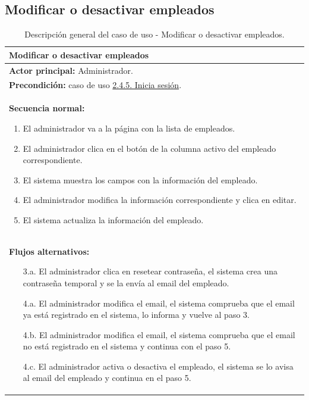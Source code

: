 \documentclass[12pt, a4paper, twoside]{report}
\begin{document}
        \subsection{Modificar o desactivar empleados}
            \begin{table}[H]
            \centering
            \begin{tabular}{|p{16cm}|} 
            \hline
            \textbf{Modificar o desactivar empleados} \\ \hline
            \textbf{Actor principal:} Administrador. \\ \hline
            \textbf{Precondición:} caso de uso \hyperref[subsec:2.4.5.]{2.4.5. Inicia sesión}. \\ \hline
            \textbf{Secuencia normal:}
                \begin{enumerate}
                    \item El administrador va a la página con la lista de empleados.
                    \item El administrador clica en el botón de la columna activo del empleado correspondiente.
                    \item El sistema muestra los campos con la información del empleado.
                    \item El administrador modifica la información correspondiente y clica en editar.
                    \item El sistema actualiza la información del empleado.
                \end{enumerate} \\ \hline
            \textbf{Flujos alternativos:}
                \begin{enumerate}
                    \item[3.a.] El administrador clica en resetear contraseña, el sistema crea una contraseña temporal y se la envía al email del empleado.
                    \item[4.a.] El administrador modifica el email, el sistema comprueba que el email ya está registrado en el sistema, lo informa y vuelve al paso 3.
                    \item[4.b.] El administrador modifica el email, el sistema comprueba que el email no está registrado en el sistema y continua con el paso 5.
                    \item[4.c.] El administrador activa o desactiva el empleado, el sistema se lo avisa al email del empleado y continua en el paso 5.
                \end{enumerate} \\ \hline
            \end{tabular}
            \caption{Descripción general del caso de uso - Modificar o desactivar empleados.}
            \end{table}
\end{document}
